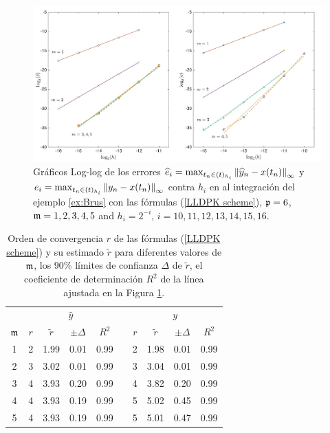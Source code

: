 \begin{figure}[h]
	\begin{center}
		\includegraphics[scale=0.45]{Graphics/lldp/m-plots.jpg}
		\caption{Gráficos Log-log de los errores $\widehat{e}_i=\max_{t_n\in(t)_{h_i}}\left\lVert \widehat{y}_n-x(t_n) \right\rVert_\infty$ y $e_i=\max_{t_n\in(t)_{h_i}}\left\lVert y_n-x(t_n) \right\rVert_\infty$ contra $h_i$ en al integración del ejemplo \ref{ex:Brus} con las fórmulas (\ref{LLDPK scheme}), $\mathfrak{p}=6$, $\mathfrak{m}=1,2,3,4,5$ and $h_i=2^{-i}$, $i=10,11,12,13,14,15,16$.}
		\label{fig:num-exp-lldp-fix-step:Fig3}
	\end{center}
\end{figure}

\begin{table}[h]
	\centering
	\caption{
        Orden de convergencia $r$ de las fórmulas (\ref{LLDPK scheme}) y su estimado  $\widetilde{r}$ para diferentes valores de $\mathfrak{m}$, los $90\%$ límites de confianza $\Delta$ de $\widetilde {r}$, el coeficiente de determinación $R^2$ de la línea ajustada en la Figura \ref{fig:num-exp-lldp-fix-step:Fig3}.\newline }
		\begin{tabular}{ c  c c c c  c  c c c c}
			\hline
			& \multicolumn{4}{c}{$\widehat{y}$} & & \multicolumn{4}{c}{$y$} \\
			\cline{2-5} \cline{7-10}
			$\mathfrak{m}$ & $r$ & $\widetilde{r}$ & $\pm\varDelta$ & $R^2$ & & $r$ & $\widetilde{r}$ & $\pm\varDelta$ & $R^2$ \\
			\hline
			1 & 2 & 1.99 & 0.01 & 0.99 & & 2 & 1.98 & 0.01 & 0.99 \\
			2 & 3 & 3.02 & 0.01 & 0.99 & & 3 & 3.04 & 0.01 & 0.99 \\
			3 & 4 & 3.93 & 0.20 & 0.99 & & 4 & 3.82 & 0.20 & 0.99 \\
			4 & 4 & 3.93 & 0.19 & 0.99 & & 5 & 5.02 & 0.45 & 0.99 \\
			5 & 4 & 3.93 & 0.19 & 0.99 & & 5 & 5.01 & 0.47 & 0.99 \\
			\hline
		\end{tabular}
	\label{tab:num-exp-lldp-fix-step:morders}
\end{table}

